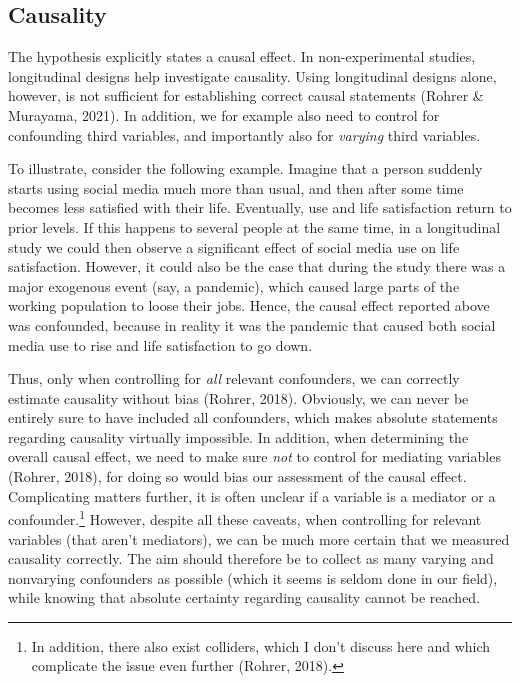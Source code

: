 \documentclass[
  english,
  man,mask,floatsintext]{apa6}
\begin{document}
\hypertarget{causality}{%
\subsection{Causality}\label{causality}}

The hypothesis explicitly states a causal effect.
In non-experimental studies, longitudinal designs help investigate causality.
Using longitudinal designs alone, however, is not sufficient for establishing correct causal statements (Rohrer \& Murayama, 2021).
In addition, we for example also need to control for confounding third variables, and importantly also for \emph{varying} third variables.

To illustrate, consider the following example.
Imagine that a person suddenly starts using social media much more than usual, and then after some time becomes less satisfied with their life.
Eventually, use and life satisfaction return to prior levels.
If this happens to several people at the same time, in a longitudinal study we could then observe a significant effect of social media use on life satisfaction.
However, it could also be the case that during the study there was a major exogenous event (say, a pandemic), which caused large parts of the working population to loose their jobs.
Hence, the causal effect reported above was confounded, because in reality it was the pandemic that caused both social media use to rise and life satisfaction to go down.

Thus, only when controlling for \emph{all} relevant confounders, we can correctly estimate causality without bias (Rohrer, 2018).
Obviously, we can never be entirely sure to have included all confounders, which makes absolute statements regarding causality virtually impossible.
In addition, when determining the overall causal effect, we need to make sure \emph{not} to control for mediating variables (Rohrer, 2018), for doing so would bias our assessment of the causal effect.
Complicating matters further, it is often unclear if a variable is a mediator or a confounder.\footnote{In addition, there also exist colliders, which I don't discuss here and which complicate the issue even further (Rohrer, 2018).}
However, despite all these caveats, when controlling for relevant variables (that aren't mediators), we can be much more certain that we measured causality correctly.
The aim should therefore be to collect as many varying and nonvarying confounders as possible (which it seems is seldom done in our field), while knowing that absolute certainty regarding causality cannot be reached.
\end{document}
